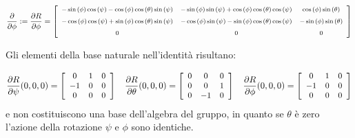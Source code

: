 \documentclass[11pt]{report}
\theoremstyle{plain}
\theoremstyle{definition}
\theoremstyle{remark}
\begin{document}
\begin{flushleft}
\begin{displaymath}\footnotesize
\dfrac{\partial}{\partial \phi} := \dfrac{\partial R}{\partial \phi} = \left[ \begin {array}{ccc} -\sin \left( \phi \right) \cos \left( \psi \right) -\cos \left( \phi \right) \cos \left( \theta \right) \sin \left( \psi \right) &-\sin \left( \phi \right) \sin \left( \psi \right) +\cos \left( \phi \right) \cos \left( \theta \right) \cos \left( \psi \right) &\cos \left( \phi \right) \sin \left( \theta \right) \\ \noalign{\medskip}-\cos \left( \phi \right) \cos \left( \psi \right) +\sin \left( \phi \right) \cos \left( \theta \right) \sin \left( \psi \right) &-\cos \left( \phi \right) \sin \left( \psi \right) -\sin \left( \phi \right) \cos \left( \theta \right) \cos \left( \psi \right) &-\sin \left( \phi \right) \sin \left( \theta \right) \\ \noalign{\medskip}0&0&0\end {array} \right]
\end{displaymath}

\end{flushleft}


Gli elementi della base naturale nell'identità risultano:

\begin{displaymath}
\small
\dfrac{\partial R}{\partial \psi} (0,0,0) = \left[ \begin{array}{ccc}
0 & 1 &0  \\
-1 & 0 & 0 \\
0 & 0 & 0 \\
\end{array} \right]
\quad
\dfrac{\partial R}{\partial \theta} (0,0,0) = \left[ \begin{array}{ccc}
0 & 0 & 0  \\
0 & 0 & 1 \\
0 & -1 & 0 \\
\end{array} \right]
\quad
\dfrac{\partial R}{\partial \phi} (0,0,0) = \left[ \begin{array}{ccc}
0 & 1 & 0  \\
-1 & 0 & 0 \\
0 & 0 & 0 \\
\end{array} \right]
\end{displaymath}
e non costituiscono una base dell'algebra del gruppo, in quanto se $\theta$ è zero l'azione della rotazione $\psi$ e $\phi$ sono identiche.
\end{document}

